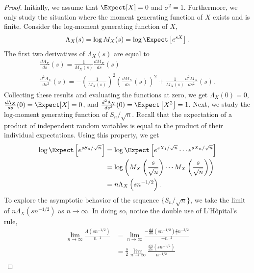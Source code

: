 \begin{proof}
Initially, we assume that $\Expect [X] = 0$ and $\sigma^2 = 1$.
Furthermore, we only study the situation where the moment generating function of $X$ exists and is finite.
Consider the log-moment generating function of $X$,
\begin{equation*}
\Lambda_X (s) = \log M_X (s)
= \log \Expect \left[ e^{sX} \right] .
\end{equation*}
The first two derivatives of $\Lambda_X (s)$ are equal to
\begin{gather*}
\frac{d \Lambda_X}{ds} (s)
= \frac{1}{M_X (s)} \frac{d M_X}{ds} (s) \\
\frac{d^2 \Lambda_X}{ds^2} (s)
= - \left( \frac{1}{M_X (s)} \right)^2 \left( \frac{d M_X}{ds} (s) \right)^2
+ \frac{1}{M_X (s)} \frac{d^2 M_X}{ds^2} (s) .
\end{gather*}
Collecting these results and evaluating the functions at zero, we get $\Lambda_X (0) = 0$, $\frac{d \Lambda_X}{ds} (0) = \Expect [X] = 0$, and $\frac{d^2 \Lambda_X}{ds^2} (0) = \Expect \left[ X^2 \right] = 1$.
Next, we study the log-moment generating function of $S_n / \sqrt{n}$.
Recall that the expectation of a product of independent random variables is equal to the product of their individual expectations.
Using this property, we get
\begin{equation*}
\begin{split}
\log \Expect \left[ e^{s S_n / \sqrt{n} } \right]
&= \log \Expect \left[ e^{s X_1 / \sqrt{n} }
\cdots e^{s X_n / \sqrt{n} } \right] \\
&= \log \left( M_X \left( \frac{s}{\sqrt{n}} \right)
\cdots M_X \left( \frac{s}{\sqrt{n}} \right) \right) \\
&= n \Lambda_X \left( s n^{-1/2} \right) .
\end{split}
\end{equation*}
To explore the asymptotic behavior of the sequence $\{ S_n / \sqrt{n} \}$, we take the limit of $n \Lambda_X \left( s n^{-1/2} \right)$ as $n \rightarrow \infty$.
In doing so, notice the double use of L'H\^{o}pital's rule,
\begin{equation*}
\begin{split}
\lim_{n \rightarrow \infty} \frac{\Lambda \left( s n^{-1/2} \right)}{n^{-1}}
&= \lim_{n \rightarrow \infty}
\frac{-\frac{d \Lambda}{dn} \left( s n^{-1/2} \right) \frac{s}{2} n^{-3/2}}{-n^{-2}} \\
&= \frac{s}{2} \lim_{n \rightarrow \infty}
\frac{\frac{d \Lambda}{dn} \left( s n^{-1/2} \right)}{n^{-1/2}} \\

\end{split}
\end{equation*}
\end{proof}
